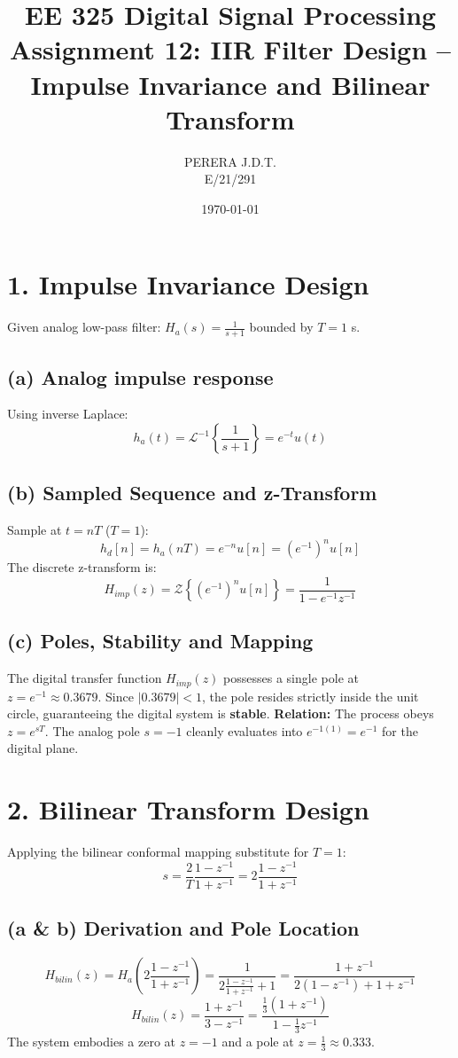 \documentclass[11pt, a4paper]{article}
\title{EE 325 Digital Signal Processing \\ Assignment 12: IIR Filter Design – Impulse Invariance and Bilinear Transform}
\author{PERERA J.D.T. \\ E/21/291}
\date{\today}
\begin{document}
\maketitle

\section{1. Impulse Invariance Design}
Given analog low-pass filter: $\displaystyle H_a(s) = \frac{1}{s + 1}$ bounded by $T = 1$ s.

\subsection{(a) Analog impulse response}
Using inverse Laplace:
$$ h_a(t) = \mathcal{L}^{-1}\left\{ \frac{1}{s+1} \right\} = e^{-t} u(t) $$

\subsection{(b) Sampled Sequence and z-Transform}
Sample at $t = nT$ ($T=1$):
$$ h_d[n] = h_a(nT) = e^{-n} u[n] = (e^{-1})^n u[n] $$
The discrete z-transform is:
$$ H_{imp}(z) = \mathcal{Z}\left\{ (e^{-1})^n u[n] \right\} = \frac{1}{1 - e^{-1} z^{-1}} $$

\subsection{(c) Poles, Stability and Mapping}
The digital transfer function $H_{imp}(z)$ possesses a single pole at $z = e^{-1} \approx 0.3679$.
Since $|0.3679| < 1$, the pole resides strictly inside the unit circle, guaranteeing the digital system is \textbf{stable}.
\textbf{Relation:} The process obeys $z = e^{sT}$. The analog pole $s = -1$ cleanly evaluates into $e^{-1(1)} = e^{-1}$ for the digital plane.

\section{2. Bilinear Transform Design}
Applying the bilinear conformal mapping substitute for $T=1$:
$$ s = \frac{2}{T} \frac{1 - z^{-1}}{1 + z^{-1}} = 2 \frac{1 - z^{-1}}{1 + z^{-1}} $$

\subsection{(a \& b) Derivation and Pole Location}
$$ H_{bilin}(z) = H_a\left( 2 \frac{1 - z^{-1}}{1 + z^{-1}} \right) = \frac{1}{ 2 \frac{1 - z^{-1}}{1 + z^{-1}} + 1 } = \frac{1 + z^{-1}}{2(1 - z^{-1}) + 1 + z^{-1}} $$
$$ H_{bilin}(z) = \frac{1 + z^{-1}}{3 - z^{-1}} = \frac{\frac{1}{3} (1 + z^{-1})}{1 - \frac{1}{3}z^{-1}} $$
The system embodies a zero at $z = -1$ and a pole at $z = \frac{1}{3} \approx 0.333$.
\end{document}
